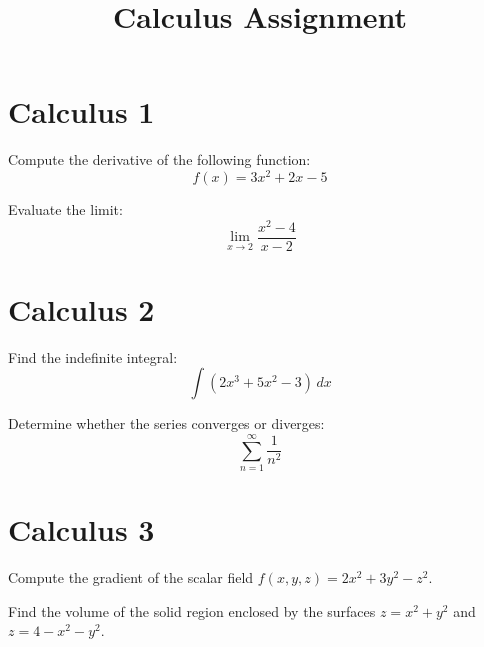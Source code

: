\documentclass[noauthor,nooutcomes]{ximera}
\title{Calculus Assignment}
\begin{document}
\begin{abstract}
\end{abstract}
\maketitle


\section{Calculus 1}

\begin{problem}
    Compute the derivative of the following function:
    \[
    f(x) = 3x^2 + 2x - 5
    \]
\end{problem}

\begin{problem}
    Evaluate the limit:
    \[
    \lim_{{x \to 2}} \frac{{x^2 - 4}}{{x - 2}}
    \]
\end{problem}

\section{Calculus 2}

\begin{problem}
    Find the indefinite integral:
    \[
    \int (2x^3 + 5x^2 - 3) \,dx
    \]
\end{problem}

\begin{problem}
    Determine whether the series converges or diverges:
    \[
    \sum_{n=1}^{\infty} \frac{1}{n^2}
    \]
\end{problem}

\section{Calculus 3}

\begin{problem}
    Compute the gradient of the scalar field $f(x, y, z) = 2x^2 + 3y^2 - z^2$.
\end{problem}

\begin{problem}
    Find the volume of the solid region enclosed by the surfaces $z = x^2 + y^2$ and $z = 4 - x^2 - y^2$.
\end{problem}
\end{document}
